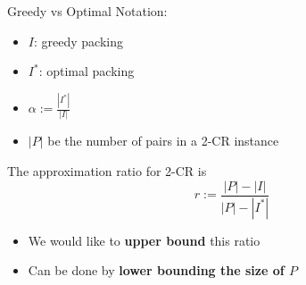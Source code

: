 \begin{frame}{Greedy vs Optimal}
Notation:
\begin{itemize}
\pause\item
\textbf{$I$}: greedy packing

\pause\item
\textbf{$I^*$}: optimal packing

\pause\item
$\alpha := \frac{|I^*|}{|I|}$ 

\pause\item
$|P|$ be the number of pairs in a 2-CR instance

\end{itemize}

\pause
\begin{observation}
The approximation ratio for 2-CR is
$$ r := \frac{|P| - |I|}{|P| - |I^*|} $$
\end{observation}

\begin{itemize}
\pause\item
We would like to \textbf{upper bound} this ratio
\pause\item
Can be done by \textbf{lower bounding the size of $P$}
\end{itemize}


\end{frame}